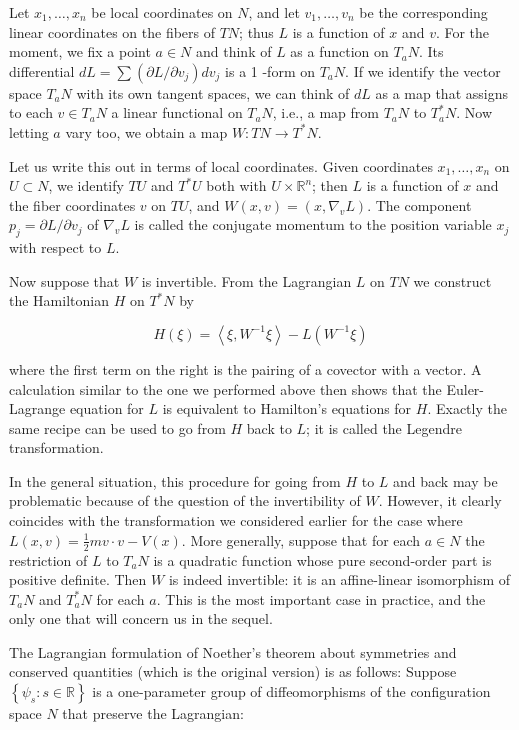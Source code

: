 \documentclass[10pt, letterpaper]{article}
\begin{document}
Let $x_{1}, \ldots, x_{n}$ be local coordinates on $N$, and let $v_{1}, \ldots, v_{n}$ be the corresponding linear coordinates on the fibers of $T N$; thus $L$ is a function of $x$ and $v$. For the moment, we fix a point $a \in N$ and think of $L$ as a function on $T_{a} N$. Its differential $d L=\sum\left(\partial L / \partial v_{j}\right) d v_{j}$ is a 1 -form on $T_{a} N$. If we identify the vector space $T_{a} N$ with its own tangent spaces, we can think of $d L$ as a map that assigns to each $v \in T_{a} N$ a linear functional on $T_{a} N$, i.e., a map from $T_{a} N$ to $T_{a}^{*} N$. Now letting $a$ vary too, we obtain a map $W: T N \rightarrow T^{*} N$.

Let us write this out in terms of local coordinates. Given coordinates $x_{1}, \ldots, x_{n}$ on $U \subset N$, we identify $T U$ and $T^{*} U$ both with $U \times \mathbb{R}^{n}$; then $L$ is a function of $x$ and the fiber coordinates $v$ on $T U$, and $W(x, v)=\left(x, \nabla_{v} L\right)$. The component $p_{j}=\partial L / \partial v_{j}$ of $\nabla_{v} L$ is called the conjugate momentum to the position variable $x_{j}$ with respect to $L$.

Now suppose that $W$ is invertible. From the Lagrangian $L$ on $T N$ we construct the Hamiltonian $H$ on $T^{*} N$ by

$$
H(\xi)=\left\langle\xi, W^{-1} \xi\right\rangle-L\left(W^{-1} \xi\right)
$$

where the first term on the right is the pairing of a covector with a vector. A calculation similar to the one we performed above then shows that the Euler-Lagrange equation for $L$ is equivalent to Hamilton's equations for $H$. Exactly the same recipe can be used to go from $H$ back to $L$; it is called the Legendre transformation.

In the general situation, this procedure for going from $H$ to $L$ and back may be problematic because of the question of the invertibility of $W$. However, it clearly\\
coincides with the transformation we considered earlier for the case where $L(x, v)= \frac{1}{2} m v \cdot v-V(x)$. More generally, suppose that for each $a \in N$ the restriction of $L$ to $T_{a} N$ is a quadratic function whose pure second-order part is positive definite. Then $W$ is indeed invertible: it is an affine-linear isomorphism of $T_{a} N$ and $T_{a}^{*} N$ for each $a$. This is the most important case in practice, and the only one that will concern us in the sequel.

The Lagrangian formulation of Noether's theorem about symmetries and conserved quantities (which is the original version) is as follows: Suppose $\left\{\psi_{s}: s \in \mathbb{R}\right\}$ is a one-parameter group of diffeomorphisms of the configuration space $N$ that preserve the Lagrangian:
\end{document}
